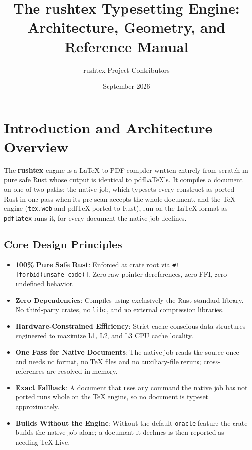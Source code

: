 \documentclass[11pt, a4paper]{article}
\title{The rushtex Typesetting Engine: Architecture, Geometry, and Reference Manual}
\author{rushtex Project Contributors}
\date{September 2026}
\begin{document}
\maketitle

\tableofcontents
\newpage

\section{Introduction and Architecture Overview}
The \textbf{rushtex} engine is a LaTeX-to-PDF compiler written entirely from scratch in pure safe Rust whose output is identical to pdfLaTeX's. It compiles a document on one of two paths: the native job, which typesets every construct as ported Rust in one pass when its pre-scan accepts the whole document, and the TeX engine (\texttt{tex.web} and pdfTeX ported to Rust), run on the LaTeX format as \texttt{pdflatex} runs it, for every document the native job declines.

\subsection{Core Design Principles}
\begin{itemize}
\item \textbf{100\% Pure Safe Rust}: Enforced at crate root via \texttt{\#![forbid(unsafe\_code)]}. Zero raw pointer dereferences, zero FFI, zero undefined behavior.
\item \textbf{Zero Dependencies}: Compiles using exclusively the Rust standard library. No third-party crates, no \texttt{libc}, and no external compression libraries.
\item \textbf{Hardware-Constrained Efficiency}: Strict cache-conscious data structures engineered to maximize L1, L2, and L3 CPU cache locality.
\item \textbf{One Pass for Native Documents}: The native job reads the source once and needs no format, no TeX files and no auxiliary-file reruns; cross-references are resolved in memory.
\item \textbf{Exact Fallback}: A document that uses any command the native job has not ported runs whole on the TeX engine, so no document is typeset approximately.
\item \textbf{Builds Without the Engine}: Without the default \texttt{oracle} feature the crate builds the native job alone; a document it declines is then reported as needing TeX Live.
\end{itemize}
\end{document}

